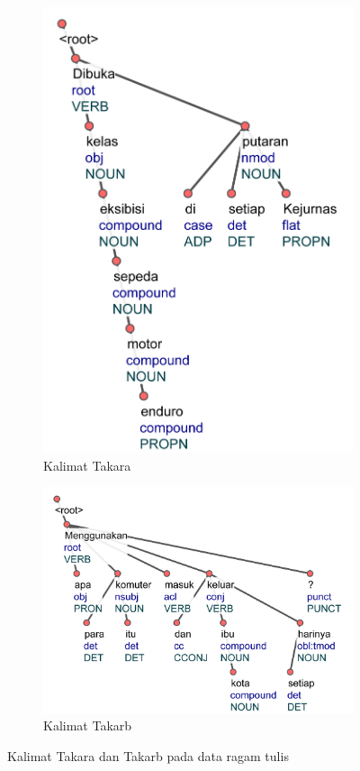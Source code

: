 \begin{figure}
\centering

\begin{subfigure}{.42\linewidth}
  \centering
  \includegraphics[width=1\linewidth] {pics/ts770.jpg} 
	\caption{Kalimat Takara}
	\label{fig:ts770} 
\end{subfigure}
%
\begin{subfigure}{.57\linewidth}
  \centering
  \includegraphics[width=1\linewidth]{pics/ts7458.jpg} 
	\caption{Kalimat Takarb}
	\label{fig:ts7458} 
\end{subfigure}
\caption{Kalimat Takara dan Takarb pada data ragam tulis}
\label{fig:rootnovalensi}
\end{figure}

